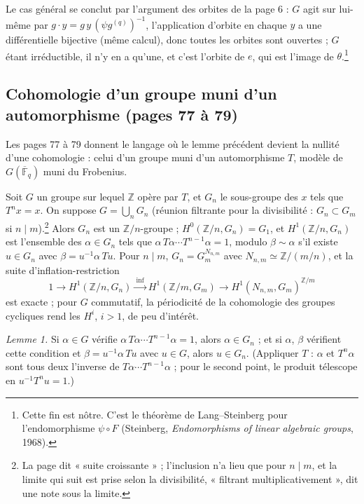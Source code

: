 \documentclass[11pt,a4paper]{article}
\begin{document}
Le cas général se conclut par l'argument des orbites de la page 6 : $G$ agit
sur lui-même par $g \cdot y = g\,y\,(\psi g^{(q)})^{-1}$, l'application d'orbite
en chaque $y$ a une différentielle bijective (même calcul), donc toutes les
orbites sont ouvertes ; $G$ étant irréductible, il n'y en a qu'une, et c'est
l'orbite de $e$, qui est l'image de $\theta$.\footnote{Cette fin est nôtre.
C'est le théorème de Lang–Steinberg pour l'endomorphisme $\psi \circ F$
(Steinberg, \emph{Endomorphisms of linear algebraic groups}, 1968).}

\subsection*{Cohomologie d'un groupe muni d'un automorphisme (pages 77 à 79)}

Les pages 77 à 79 donnent le langage où le lemme précédent devient la nullité
d'une cohomologie : celui d'un groupe muni d'un automorphisme $T$, modèle de
$G(\overline{\mathbb{F}}_q)$ muni du Frobenius.

Soit $G$ un groupe sur lequel $\mathbb{Z}$ opère par $T$, et $G_n$ le
sous-groupe des $x$ tels que $T^{n}x = x$. On suppose $G = \bigcup_n G_n$
(réunion filtrante pour la divisibilité : $G_n \subset G_m$ si $n \mid
m$).\footnote{La page dit « suite croissante » ; l'inclusion n'a lieu que pour
$n \mid m$, et la limite qui suit est prise selon la divisibilité, « filtrant
multiplicativement », dit une note sous la limite.} Alors $G_n$ est un
$\mathbb{Z}/n$-groupe ; $H^0(\mathbb{Z}/n, G_n) = G_1$, et $H^1(\mathbb{Z}/n,
G_n)$ est l'ensemble des $\alpha \in G_n$ tels que $\alpha\,T\alpha \cdots
T^{n-1}\alpha = 1$, modulo $\beta \sim \alpha$ s'il existe $u \in G_n$ avec
$\beta = u^{-1}\alpha\,Tu$. Pour $n \mid m$, $G_n = G_m^{N_{n,m}}$ avec $N_{n,m}
\simeq \mathbb{Z}/(m/n)$, et la suite d'inflation-restriction
\[
1 \to H^1(\mathbb{Z}/n, G_n) \xrightarrow{\ \mathrm{inf}\ } H^1(\mathbb{Z}/m,
G_m) \to H^1(N_{n,m}, G_m)^{\mathbb{Z}/m}
\]
est exacte ; pour $G$ commutatif, la périodicité de la cohomologie des groupes
cycliques rend les $H^{i}$, $i > 1$, de peu d'intérêt.

\emph{Lemme 1.} Si $\alpha \in G$ vérifie $\alpha\,T\alpha \cdots T^{n-1}\alpha =
1$, alors $\alpha \in G_n$ ; et si $\alpha$, $\beta$ vérifient cette condition et
$\beta = u^{-1}\alpha\,Tu$ avec $u \in G$, alors $u \in G_n$. (Appliquer $T$ :
$\alpha$ et $T^{n}\alpha$ sont tous deux l'inverse de $T\alpha \cdots
T^{n-1}\alpha$ ; pour le second point, le produit télescope en
$u^{-1}T^{n}u = 1$.)
\end{document}
